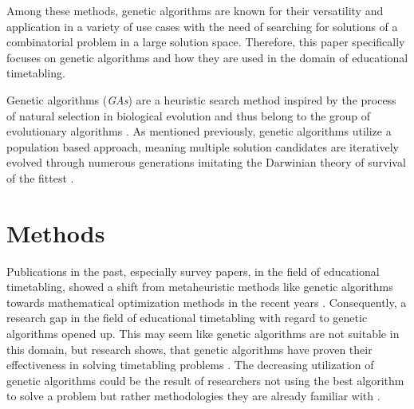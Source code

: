 \documentclass[sigconf]{acmart}
\begin{document}
Among these methods, genetic algorithms are known for their versatility and
application in a variety of use cases with the need of searching for solutions
of a combinatorial problem in a large solution space.
Therefore, this paper specifically focuses on genetic algorithms and how they
are used in the domain of educational timetabling.

Genetic algorithms (\textit{GAs}) are a heuristic search method inspired by
the process of natural selection in biological evolution and thus belong to
the group of evolutionary algorithms \cite{Katoch2021}. As mentioned previously,
genetic algorithms utilize a population based approach, meaning multiple
solution candidates are iteratively evolved through numerous generations
imitating the Darwinian theory of survival of the fittest \cite{Katoch2021}.



\section{Methods}
Publications in the past, especially survey papers, in the field of educational
timetabling, showed a shift from metaheuristic methods like genetic algorithms
towards mathematical optimization methods in the recent years
\cite{Tan2021}.
%
Consequently, a research gap in the field of educational timetabling
with regard to genetic algorithms opened up.
%
This may seem like genetic algorithms are not suitable in this domain,
but research shows, that genetic algorithms have proven their effectiveness
in solving timetabling problems \cite{Rezaeipanah2019,Chen2021}.
%
The decreasing utilization of genetic algorithms could be the result of
researchers not using the best algorithm to solve a problem but rather
methodologies they are already familiar with \cite{Ceschia2023}.
\end{document}

